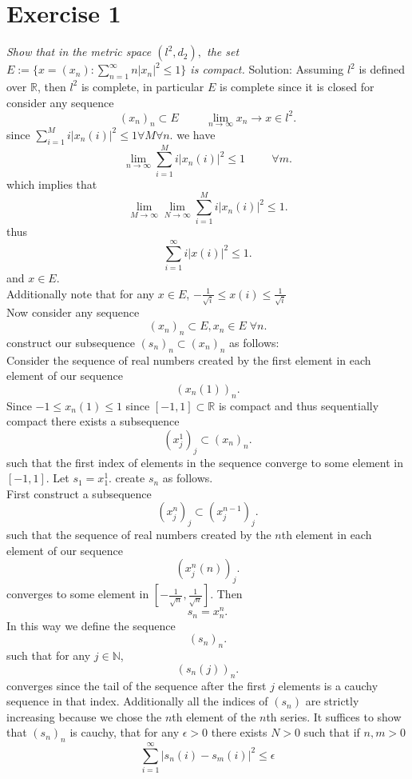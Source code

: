 \documentclass[11pt]{article}
\newcommand{\solution}[1]{{{\textcolor{header}{Solution:} \textcolor{solution}{#1}}}}
\begin{document}
\section{Exercise 1}
\emph{
    Show that in the metric space $(l^2,d_2),$ the set
    $E := \{x = (x_n): \sum_{n=1}^{\infty}n|x_n|^2 \le 1\}$ is compact.
}
\solution{
Assuming $l^2$ is defined over $ \mathbb{R}$, then $l^2$ is complete, in particular $E$ is complete since it is closed for consider any sequence
\[
    (x_n)_n \subset E \hspace{1cm} \lim_{n\to \infty}x_n \rightarrow x \in l^2
.\] 
since $\sum_{i=1}^{M}i|x_n(i)|^2 \le 1 \forall M \forall n$. we have
\[
    \lim_{n\to \infty} \sum_{i=1}^{M}i|x_n(i)|^2 \le 1 \hspace{1cm} \forall m
.\] 
which implies that
\[
\lim_{M\to \infty}\lim_{N\to \infty}\sum_{i=1}^{M}i|x_n(i)|^2 \le 1
.\] 
thus
\[
\sum_{i=1}^{\infty}i|x(i)|^2 \le 1
.\] 
and $x \in E$.\\
Additionally note that for any $x \in E$, $-\frac{1}{\sqrt{i}} \le x(i) \le \frac{1}{\sqrt{i}}$
\\
Now consider any sequence
\[
    (x_n)_n \subset E, x_n \in E \; \forall n
.\] 
construct our subsequence $(s_n)_n \subset (x_n)_n$ as follows:\\
Consider  the sequence of real numbers created by the first element in each element of our sequence
\[
    (x_n(1))_n
.\] 
Since $-1 \le x_n(1) \le 1$ since $[-1,1] \subset \mathbb{R}$ is compact and thus sequentially compact there exists a subsequence
\[
    (x_{j}^{1})_j \subset (x_n)_n
.\] 
such that the first index of elements in the sequence converge to some element in $[-1,1]$. Let $s_1 = x^{1}_1$.
create $s_n$ as follows.\\
First construct a subsequence
\[
    (x_j^{n})_j \subset (x_j^{n-1})_j
.\] 
such that the sequence of real numbers created by the $n$th element in each element of our sequence
\[
    (x_j^{n}(n))_j 
.\] 
converges to some element in $[-\frac{1}{\sqrt{n}},\frac{1}{\sqrt{n}}]$. Then 
\[
s_n = x^{n}_n
.\] 
In this way we define the sequence
\[
    (s_n)_n
.\] 
such that for any $j \in \mathbb{N}$,
\[
    (s_n(j))_n
.\] 
converges since the tail of the sequence after the first $j$ elements is a cauchy sequence in that index.
Additionally all the indices of $(s_n)$ are strictly increasing because we chose the $n$th element of the $n$th series.
It suffices to show that $(s_n)_n$ is cauchy, that for any $\epsilon > 0$ there exists $N >0$ such that if $n,m > 0$ 
\[
\sum_{i=1}^{\infty}|s_n(i)-s_m(i)|^2 \le \epsilon
\]}
\end{document}
